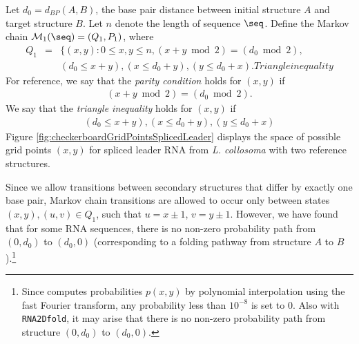 \begin{description}
Let $d_0= d_{BP}(A,B)$, the base pair distance between initial structure
$A$ and target structure $B$.  Let $n$ denote the length of sequence $\seq$.
Define the Markov chain $\mathcal{M}_1(\seq) = (Q_1,P_1)$, where
\begin{eqnarray}
\label{eq:defQ1} Q_1 &=& \{ (x,y) : 0 \leq x,y \leq n, (x+y \bmod 2)
= (d_0 \bmod 2), \\ %
& & (d_0 \leq x+y), (x \leq d_0 + y), (y \leq d_0 + x). \nonumber %
Triangle inequality
\end{eqnarray}
For reference, we say that the {\em parity condition} holds for
$(x,y)$ if
\begin{eqnarray}
\label{eq:parityCondition} (x+y \bmod 2) = (d_0 \bmod 2).
\end{eqnarray}
We say that the {\em triangle inequality} holds for $(x,y)$ if
\begin{eqnarray}
\label{eq:triangleInequality} (d_0 \leq x+y), (x \leq d_0 + y), (y
\leq d_0 + x)
\end{eqnarray}
Figure \ref{fig:checkerboardGridPointsSplicedLeader} displays the
space of possible grid points $(x,y)$ for spliced leader RNA from {\em
L. collosoma} with two reference structures.

Since we allow transitions between secondary structures that differ by
exactly one base pair, Markov chain transitions are allowed to occur
only between states $(x,y),(u,v) \in Q_1$, such that $u=x\pm 1$, $v =
y \pm 1$. However, we have found that for some RNA sequences, there is
no non-zero probability path from $(0,d_0)$ to $(d_0,0)$
(corresponding to a folding pathway from structure $A$ to
$B$).\footnote{Since \ffttwo computes probabilities $p(x,y)$ by
polynomial interpolation using the fast Fourier transform, any
probability less than $10^{-8}$ is set to $0$. Also with {\tt
RNA2Dfold}, it may arise that there is no non-zero probability path
from structure $(0,d_0)$ to $(d_0,0)$.}


\end{description}
